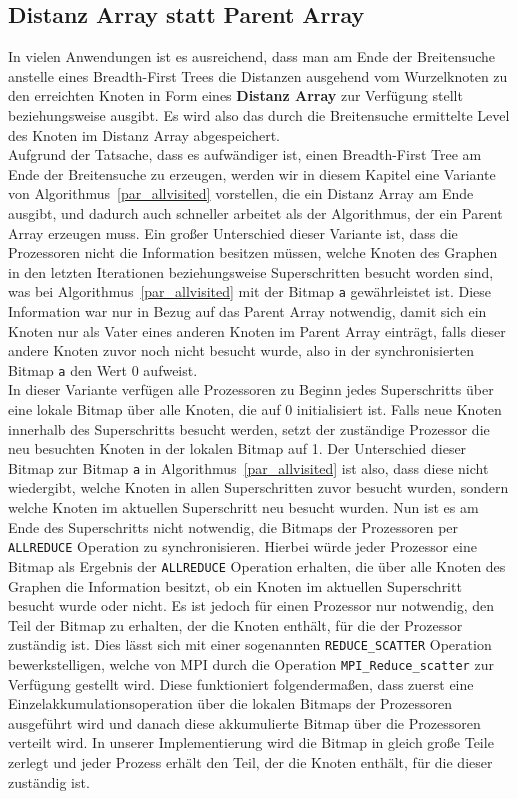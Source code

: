 \documentclass[11pt,a4paper]{article}
\begin{document}
\subsection{Distanz Array statt Parent Array}
\label{sec:distanzarray}
In vielen Anwendungen ist es ausreichend, dass man am Ende der Breitensuche anstelle eines Breadth-First Trees die Distanzen ausgehend vom Wurzelknoten zu den erreichten Knoten in Form eines \textbf{Distanz Array} zur Verfügung stellt beziehungsweise ausgibt. Es wird also das durch die Breitensuche ermittelte Level des Knoten im Distanz Array abgespeichert.\\
Aufgrund der Tatsache, dass es aufwändiger ist, einen Breadth-First Tree am Ende der Breitensuche zu erzeugen, werden wir in diesem Kapitel eine Variante von Algorithmus~\ref{par_allvisited} vorstellen, die ein Distanz Array am Ende ausgibt, und dadurch auch schneller arbeitet als der Algorithmus, der ein Parent Array erzeugen muss. Ein großer Unterschied dieser Variante ist, dass die Prozessoren nicht die Information besitzen müssen, welche Knoten des Graphen in den letzten Iterationen beziehungsweise Superschritten besucht worden sind, was bei Algorithmus~\ref{par_allvisited} mit der Bitmap \lstinline{a} gewährleistet ist.  Diese Information war nur in Bezug auf das Parent Array notwendig, damit sich ein Knoten nur als Vater eines anderen Knoten im Parent Array einträgt, falls dieser andere Knoten zuvor noch nicht besucht wurde, also in der synchronisierten Bitmap \lstinline{a} den Wert 0 aufweist.\\
In dieser Variante verfügen alle Prozessoren zu Beginn jedes Superschritts über eine lokale Bitmap über alle Knoten, die auf 0 initialisiert ist. Falls neue Knoten innerhalb des Superschritts besucht werden, setzt der zuständige Prozessor die neu besuchten Knoten in der lokalen Bitmap auf 1. Der Unterschied dieser Bitmap zur Bitmap \lstinline{a} in Algorithmus~\ref{par_allvisited} ist also, dass diese nicht wiedergibt, welche Knoten in allen Superschritten zuvor besucht wurden, sondern welche Knoten im aktuellen Superschritt neu besucht wurden. Nun ist es am Ende des Superschritts nicht notwendig, die Bitmaps der Prozessoren per \lstinline{ALLREDUCE} Operation zu synchronisieren. Hierbei würde jeder Prozessor eine Bitmap als Ergebnis der \lstinline{ALLREDUCE} Operation erhalten, die über alle Knoten des Graphen die Information besitzt, ob ein Knoten im aktuellen Superschritt besucht wurde oder nicht. Es ist jedoch für einen Prozessor nur notwendig, den Teil der Bitmap zu erhalten, der die Knoten enthält, für die der Prozessor zuständig ist. Dies lässt sich mit einer sogenannten \lstinline{REDUCE_SCATTER} Operation bewerkstelligen, welche von MPI durch die Operation \lstinline{MPI_Reduce_scatter} zur Verfügung gestellt wird. Diese funktioniert folgendermaßen, dass zuerst eine Einzelakkumulationsoperation über die lokalen Bitmaps der Prozessoren ausgeführt wird und danach diese akkumulierte Bitmap über die Prozessoren verteilt wird. In unserer Implementierung wird die Bitmap in gleich große Teile zerlegt und jeder Prozess erhält den Teil, der die Knoten enthält, für die dieser zuständig ist.\\
\end{document}
